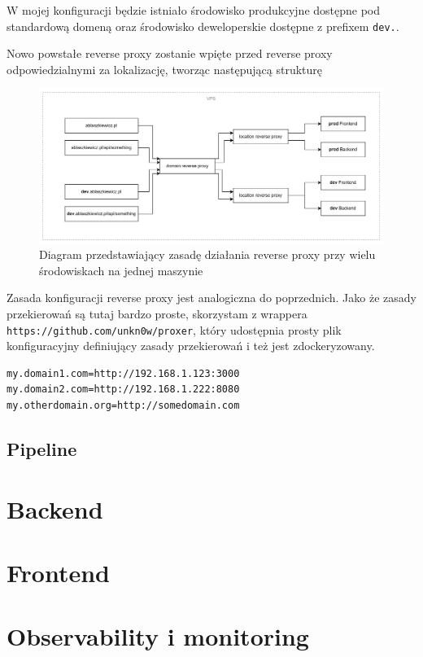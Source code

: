 \documentclass{article}
\begin{document}
W mojej konfiguracji będzie istniało środowisko produkcyjne dostępne pod standardową domeną oraz środowisko deweloperskie dostępne z prefixem \lstinline|dev.|.

Nowo powstałe reverse proxy zostanie wpięte przed reverse proxy odpowiedzialnymi za lokalizację, tworząc następującą strukturę

\begin{figure}[H]
    \centering
    \includegraphics[width=1\linewidth]{domainReverseProxy.png}
    \caption{Diagram przedstawiający zasadę działania reverse proxy przy wielu środowiskach na jednej maszynie}
    \label{fig:enter-label}
\end{figure}


Zasada konfiguracji reverse proxy jest analogiczna do poprzednich. Jako że zasady przekierowań są tutaj bardzo proste, skorzystam z wrappera \lstinline|https://github.com/unkn0w/proxer|, który udostępnia prosty plik konfiguracyjny definiujący zasady przekierowań i też jest zdockeryzowany.

\begin{lstlisting}[caption=Plik \lstinline|/infrastructure/reverse-proxy/src/nxconf.sh|]
my.domain1.com=http://192.168.1.123:3000
my.domain2.com=http://192.168.1.222:8080
my.otherdomain.org=http://somedomain.com
\end{lstlisting}

\subsection{Pipeline}

\section{Backend}
\section{Frontend}
\section{Observability i monitoring}
\end{document}
